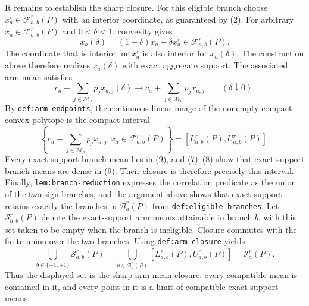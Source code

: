 It remains to establish the sharp closure.  For this eligible branch choose \(x_a^\circ\in\mathcal F_{a,b}^r(P)\) with an interior coordinate, as guaranteed by (2).  For arbitrary \(x_a\in\mathcal F_{a,b}^r(P)\) and \(0<\delta<1\), convexity gives
\[
x_a(\delta)=(1-\delta)x_a+\delta x_a^\circ
\in\mathcal F_{a,b}^r(P).
\tag{7}
\]
The coordinate that is interior for \(x_a^\circ\) is also interior for \(x_a(\delta)\).  The construction above therefore realizes \(x_a(\delta)\) with exact aggregate support.  The associated arm mean satisfies
\[
c_a+\sum_{j\in\mathcal M_a}p_jx_{a,j}(\delta)
\longrightarrow
c_a+\sum_{j\in\mathcal M_a}p_jx_{a,j}
\qquad(\delta\downarrow0).
\tag{8}
\]
By \texttt{def:arm-endpoints}, the continuous linear image of the nonempty compact convex polytope is the compact interval
\[
\left\{c_a+\sum_{j\in\mathcal M_a}p_jx_{a,j}:
x_a\in\mathcal F_{a,b}^r(P)\right\}
=[L_{a,b}^r(P),U_{a,b}^r(P)].
\tag{9}
\]
Every exact-support branch mean lies in (9), and (7)--(8) show that exact-support branch means are dense in (9).  Their closure is therefore precisely this interval.  Finally, \texttt{lem:branch-reduction} expresses the correlation predicate as the union of the two sign branches, and the argument above shows that exact support retains exactly the branches in \(\mathcal B_a^r(P)\) from \texttt{def:eligible-branches}.  Let \(\mathscr S_{a,b}^r(P)\) denote the exact-support arm means attainable in branch \(b\), with this set taken to be empty when the branch is ineligible.  Closure commutes with the finite union over the two branches.  Using \texttt{def:arm-closure} yields
\[
\overline{\bigcup_{b\in\{-1,+1\}}\mathscr S_{a,b}^r(P)}
=\bigcup_{b\in\mathcal B_a^r(P)}[L_{a,b}^r(P),U_{a,b}^r(P)]
=\mathcal I_a^r(P).
\tag{10}
\]
Thus the displayed set is the sharp arm-mean closure: every compatible mean is contained in it, and every point in it is a limit of compatible exact-support means.
